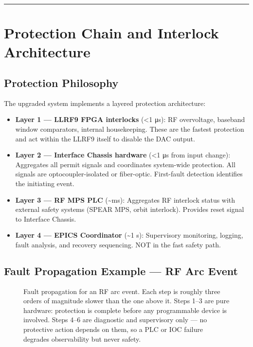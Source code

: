 \begin{center}\rule{0.5\linewidth}{0.5pt}\end{center}

\section{Protection Chain and Interlock Architecture}\label{protection-chain-and-interlock-architecture}

\subsection{Protection Philosophy}\label{protection-philosophy}

The upgraded system implements a layered protection architecture:

\begin{itemize}
\tightlist
\item
  \textbf{Layer 1 --- LLRF9 FPGA interlocks} (\textless1 μs): RF overvoltage, baseband window comparators, internal housekeeping. These are the fastest protection and act within the LLRF9 itself to disable the DAC output.
\item
  \textbf{Layer 2 --- Interface Chassis hardware} (\textless1 μs from input change): Aggregates all permit signals and coordinates system-wide protection. All signals are optocoupler-isolated or fiber-optic. First-fault detection identifies the initiating event.
\item
  \textbf{Layer 3 --- RF MPS PLC} (\textasciitilde ms): Aggregates RF interlock status with external safety systems (SPEAR MPS, orbit interlock). Provides reset signal to Interface Chassis.
\item
  \textbf{Layer 4 --- EPICS Coordinator} (\textasciitilde1 s): Supervisory monitoring, logging, fault analysis, and recovery sequencing. NOT in the fast safety path.
\end{itemize}

\subsection{Fault Propagation Example --- RF Arc Event}\label{fault-propagation-example-rf-arc-event}

\begin{figure}[tbp]
\centering
\begin{fitpicture}\end{fitpicture}
\caption{Fault propagation for an RF arc event.  Each step is roughly three orders of magnitude slower than the one above it.  Steps 1--3 are pure hardware: protection is complete before any programmable device is involved.  Steps 4--6 are diagnostic and supervisory only --- no protective action depends on them, so a PLC or IOC failure degrades observability but never safety.}\label{fig:fault-propagation}
\end{figure}
